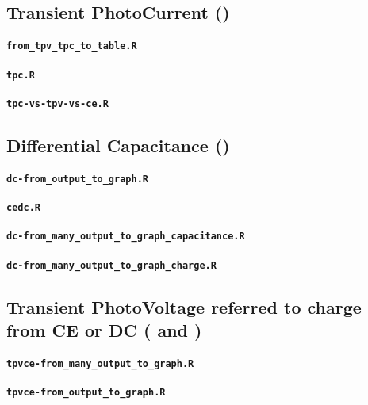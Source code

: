 \subsection{Transient PhotoCurrent ()}\label{r_tpc}
\paragraph{\texttt{from_tpv_tpc_to_table.R}}
\paragraph{\texttt{tpc.R}}
\paragraph{\texttt{tpc-vs-tpv-vs-ce.R}}


\subsection{Differential Capacitance ()}\label{r_dc}

\paragraph{\texttt{dc-from_output_to_graph.R}}
\paragraph{\texttt{cedc.R}}
\paragraph{\texttt{dc-from_many_output_to_graph_capacitance.R}}
\paragraph{\texttt{dc-from_many_output_to_graph_charge.R}}

\subsection{Transient PhotoVoltage referred to charge from CE or DC ( and )}\label{r_tpvcedc}


\paragraph{\texttt{tpvce-from_many_output_to_graph.R}}
\paragraph{\texttt{tpvce-from_output_to_graph.R}}
